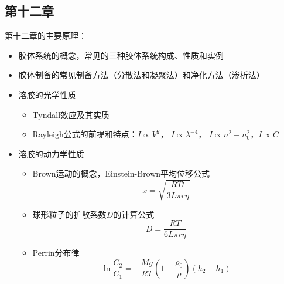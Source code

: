 \documentclass[9pt]{beamer}
\begin{document}
	\subsection{第十二章}
	\begin{frame}
	
	第十二章的主要原理：	
	
	\begin{itemize}
	
	\item 胶体系统的概念，常见的三种胶体系统构成、性质和实例
	
	\item 胶体制备的常见制备方法（分散法和凝聚法）和净化方法（渗析法）
	
	\item 溶胶的光学性质
		\begin{itemize}
	
		\item Tyndall效应及其实质
	
		\item Rayleigh公式的前提和特点：$I \propto V^2$， $I \propto \lambda^{-4}$， $I \propto n^2-n^2_0 $，$I \propto C$
	
		\end{itemize}		
	
	\item 溶胶的动力学性质
		\begin{itemize}
		
		\item Brown运动的概念，Einstein-Brown平均位移公式
		\[
			\bar x = \sqrt{ \frac{ RTt }{ 3L\pi r \eta } }
		\]
		
		\item 球形粒子的扩散系数$D$的计算公式
		\[
			D = \frac{ RT }{ 6L\pi r \eta }
		\]
		
		\item Perrin分布律
		\[
			\ln{ \frac{ C_2 }{ C_1 } } = - \frac{ Mg }{ RT } \left( 1 - \frac{ \rho_0 }{ \rho } \right) ( h_2 - h_1 )
		\]
		
		\end{itemize}
	
	\end{itemize}
	
	\end{frame}
	
\end{document}

